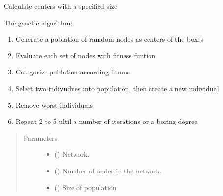 \documentclass[letterpaper,10pt,english]{sphinxmanual}
\begin{document}
\begin{fulllineitems}
\label{\detokenize{Genetic:Genetic.Genetic.calculateCentersFixedSize}}
Calculate centers with a specified size

The genetic algorithm:
\begin{enumerate}
\def\theenumi{\arabic{enumi}}
\def\labelenumi{\theenumi .}
\makeatletter\def\p@enumii{\p@enumi \theenumi .}\makeatother
\item {} 
Generate a poblation of ramdom nodes as centers of the boxes

\item {} 
Evaluate each set of nodes with fitness funtion

\item {} 
Categorize poblation according fitness

\item {} 
Select two indivudues into population, then create a new individual

\item {} 
Remove worst individuals

\item {} 
Repeat 2 to 5 ultil a number of iterations or a boring degree

\end{enumerate}
\begin{quote}\begin{description}
\item[{Parameters}] \leavevmode\begin{itemize}
\item {} 
 () \textendash{} Network.

\item {} 
 () \textendash{} Number of nodes in the network.

\item {} 
 () \textendash{} Size of population


\end{itemize}
\end{description}
\end{quote}
\end{fulllineitems}
\end{document}
